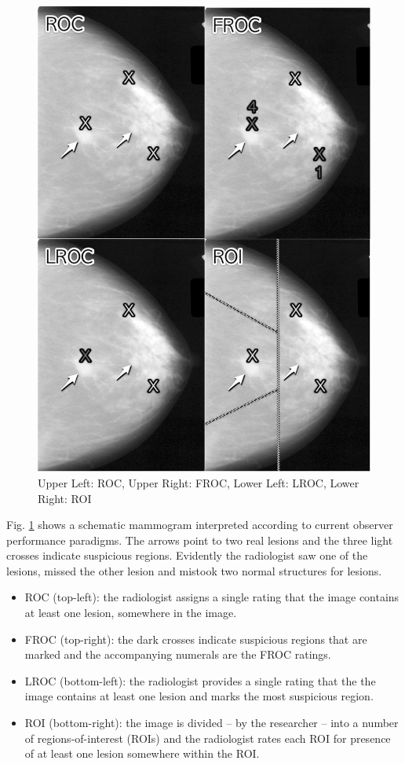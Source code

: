 \documentclass[
]{book}
\providecommand{\tightlist}{%
  \setlength{\itemsep}{0pt}\setlength{\parskip}{0pt}}
\begin{document}
\begin{figure}
\includegraphics[width=1\linewidth]{images/4Paradigms} \caption{Upper Left: ROC, Upper Right: FROC, Lower Left: LROC, Lower Right: ROI}\label{fig:froc-paradigm-4}
\end{figure}

Fig. \ref{fig:froc-paradigm-4} shows a schematic mammogram interpreted according to current observer performance paradigms. The arrows point to two real lesions and the three light crosses indicate suspicious regions. Evidently the radiologist saw one of the lesions, missed the other lesion and mistook two normal structures for lesions.

\begin{itemize}
\tightlist
\item
  ROC (top-left): the radiologist assigns a single rating that the image contains at least one lesion, somewhere in the image.
\item
  FROC (top-right): the dark crosses indicate suspicious regions that are marked and the accompanying numerals are the FROC ratings.
\item
  LROC (bottom-left): the radiologist provides a single rating that the the image contains at least one lesion and marks the most suspicious region.
\item
  ROI (bottom-right): the image is divided -- by the researcher -- into a number of regions-of-interest (ROIs) and the radiologist rates each ROI for presence of at least one lesion somewhere within the ROI.
\end{itemize}
\end{document}
